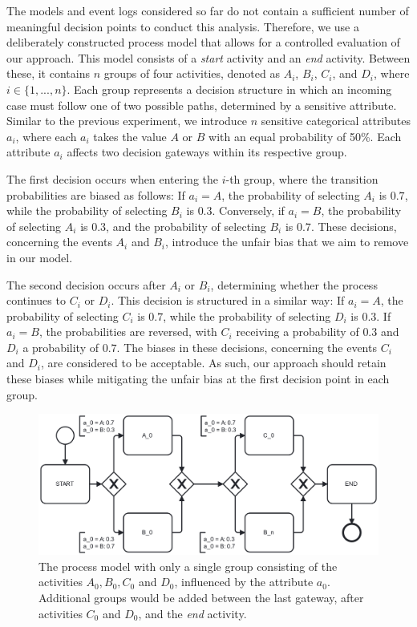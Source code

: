 The models and event logs considered so far do not contain a sufficient number of meaningful decision points to conduct this analysis.
Therefore, we use a deliberately constructed process model that allows for a controlled evaluation of our approach.
This model consists of a \textit{start} activity and an \textit{end} activity.
Between these, it contains $n$ groups of four activities, denoted as $A_i$, $B_i$, $C_i$, and $D_i$, where $i \in \{1, ..., n\}$.
Each group represents a decision structure in which an incoming case must follow one of two possible paths, determined by a sensitive attribute. 
Similar to the previous experiment, we introduce $n$ sensitive categorical attributes $a_i$, where each $a_i$ takes the value $A$ or $B$ with an equal probability of 50\%.
Each attribute $a_i$ affects two decision gateways within its respective group.

The first decision occurs when entering the $i$-th group, where the transition probabilities are biased as follows:
If $a_i = A$, the probability of selecting $A_i$ is $0.7$, while the probability of selecting $B_i$ is $0.3$.
Conversely, if $a_i = B$, the probability of selecting $A_i$ is $0.3$, and the probability of selecting $B_i$ is $0.7$.
These decisions, concerning the events $A_i$ and $B_i$, introduce the unfair bias that we aim to remove in our model. 

The second decision occurs after $A_i$ or $B_i$, determining whether the process continues to $C_i$ or $D_i$.
This decision is structured in a similar way:
If $a_i = A$, the probability of selecting $C_i$ is $0.7$, while the probability of selecting $D_i$ is $0.3$.
If $a_i = B$, the probabilities are reversed, with $C_i$ receiving a probability of $0.3$ and $D_i$ a probability of $0.7$.
The biases in these decisions, concerning the events $C_i$ and $D_i$, are considered to be acceptable.
As such, our approach should retain these biases while mitigating the unfair bias at the first decision point in each group. 

\begin{figure}[h!]
    \centering
    \includegraphics[width=\textwidth]{gfx/ablation_decision.png}
    \caption{The process model with only a single group consisting of the activities $A_0, B_0, C_0$ and $D_0$, influenced by the attribute $a_0$.
    Additional groups would be added between the last gateway, after activities $C_0$ and $D_0$, and the \textit{end} activity.}
    \label{fig:ablation_decision_model}
\end{figure}

